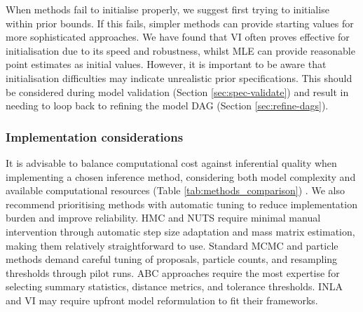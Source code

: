 \documentclass{article}
\begin{document}
When methods fail to initialise properly, we suggest first trying to initialise within prior bounds.
If this fails, simpler methods can provide starting values for more sophisticated approaches.
We have found that \ac{VI} often proves effective for initialisation due to its speed and robustness, whilst \ac{MLE} can provide reasonable point estimates as initial values.
However, it is important to be aware that initialisation difficulties may indicate unrealistic prior specifications.
This should be considered during model validation (Section \ref{sec:spec-validate}) and result in needing to loop back to refining the model \ac{DAG} (Section \ref{sec:refine-dags}).

\subsubsection{Implementation considerations}

It is advisable to balance computational cost against inferential quality when implementing a chosen inference method, considering both model complexity and available computational resources (Table \ref{tab:methods_comparison}) \citep{funk2020choices}.
We also recommend prioritising methods with automatic tuning to reduce implementation burden and improve reliability.
\ac{HMC} and \ac{NUTS} require minimal manual intervention through automatic step size adaptation and mass matrix estimation, making them relatively straightforward to use.
Standard \ac{MCMC} and particle methods demand careful tuning of proposals, particle counts, and resampling thresholds through pilot runs.
\ac{ABC} approaches require the most expertise for selecting summary statistics, distance metrics, and tolerance thresholds.
\ac{INLA} and \ac{VI} may require upfront model reformulation to fit their frameworks.
\end{document}
